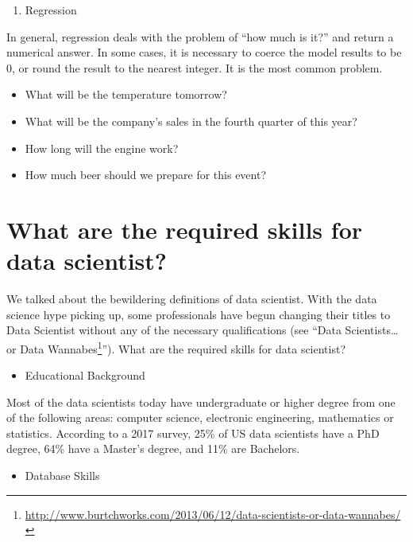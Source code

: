 \documentclass[12pt,]{krantz}
\providecommand{\tightlist}{%
  \setlength{\itemsep}{0pt}\setlength{\parskip}{0pt}}
\renewcommand{\href}[2]{#2\footnote{\url{#1}}}
\theoremstyle{definition}
\theoremstyle{definition}
\theoremstyle{remark}
\begin{document}
\begin{enumerate}
\def\labelenumi{\arabic{enumi}.}
\setcounter{enumi}{4}
\tightlist
\item
  Regression
\end{enumerate}

In general, regression deals with the problem of ``how much is it?'' and
return a numerical answer. In some cases, it is necessary to coerce the
model results to be 0, or round the result to the nearest integer. It is
the most common problem.

\begin{itemize}
\tightlist
\item
  What will be the temperature tomorrow?
\item
  What will be the company's sales in the fourth quarter of this year?
\item
  How long will the engine work?
\item
  How much beer should we prepare for this event?
\end{itemize}

\section{What are the required skills for data
scientist?}\label{what-are-the-required-skills-for-data-scientist}

We talked about the bewildering definitions of data scientist. With the
data science hype picking up, some professionals have begun changing
their titles to Data Scientist without any of the necessary
qualifications (see
``\href{http://www.burtchworks.com/2013/06/12/data-scientists-or-data-wannabes/}{Data
Scientists\ldots{}or Data Wannabes}''). What are the required skills for
data scientist?

\begin{itemize}
\tightlist
\item
  Educational Background
\end{itemize}

Most of the data scientists today have undergraduate or higher degree
from one of the following areas: computer science, electronic
engineering, mathematics or statistics. According to a 2017 survey, 25\%
of US data scientists have a PhD degree, 64\% have a Master's degree,
and 11\% are Bachelors.

\begin{itemize}
\tightlist
\item
  Database Skills
\end{itemize}
\end{document}
